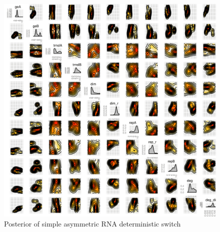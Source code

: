 \begin{figure}[htbp]
\begin{center}
\includegraphics[scale=0.15]{chapterStabilityFinder/mass_action_switches/deterministic/asym/posterior_cl_rna.png}
\caption{Posterior of simple asymmetric RNA deterministic switch}\label{fig:asym_det_cl_rna_ma_post}
\end{center}
\end{figure}




